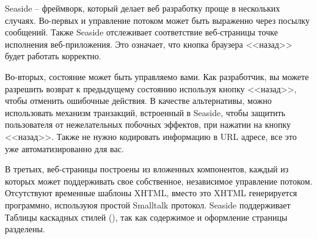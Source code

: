 \documentclass[a4paper,10pt,twoside]{book}
\begin{document}

Seaside -- фреймворк, который делает веб разработку проще в нескольких 
случаях.
Во-первых и управление потоком может быть выраженно через посылку
сообщений. Также Seaside отслеживает соответствие веб-страницы точке
исполнения веб-приложения. Это означает, что кнопка браузера <<назад>>
будет работать корректно.



Во-вторых, состояние может быть управляемо вами.
Как разработчик, вы можете разрешить возврат к предыдущему состоянию
используя кнопку <<назад>>, чтобы отменить ошибочные действия.
В качестве альтернативы, можно использовать механизм транзакций,
встроенный в Seaside,
чтобы защитить пользователя от нежелательных побочных эффектов,
при нажатии на кнопку <<назад>>.
Также не нужно кодировать информацию в URL адресе, все это уже автоматизированно для вас.


В третьих, веб-страницы построены из вложенных компонентов,
каждый из которых может поддерживать свое собственное,
независимое управление потоком.
Отсутствуют временные шаблоны XHTML,
вместо это XHTML генерируется программно,
используюя простой Smalltalk протокол.
Seaside поддерживает Таблицы каскадных стилей (),
так как содержимое и оформление страницы разделены.

\end{document}
